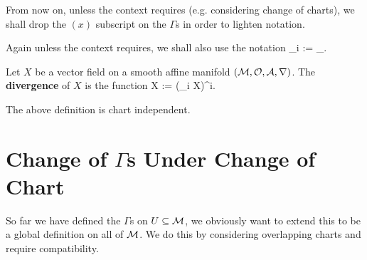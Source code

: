 \bnn 
    \benr 
        \item From now on, unless the context requires (e.g. considering change of charts), we shall drop the $(x)$ subscript on the $\Gamma$s in order to lighten notation.
        \item Again unless the context requires, we shall also use the notation 
        \bse 
            \nabla_i := \nabla_{}.
        \ese 
    \een 
\enn 

    Let $X$ be a vector field on a smooth affine manifold $(\mathcal{M},\mathcal{O},\mathcal{A},\nabla)$. The \textbf{divergence} of $X$ is the function 
    \bse 
        X := (\nabla_i X)^i.
    \ese 
\ed 

\bcl 
    The above definition is chart independent.
\ecl 

\section{Change of $\Gamma$s Under Change of Chart}

So far we have defined the $\Gamma$s on $U\subseteq\mathcal{M}$, we obviously want to extend this to be a global definition on all of $\mathcal{M}$. We do this by considering overlapping charts and require compatibility. 

